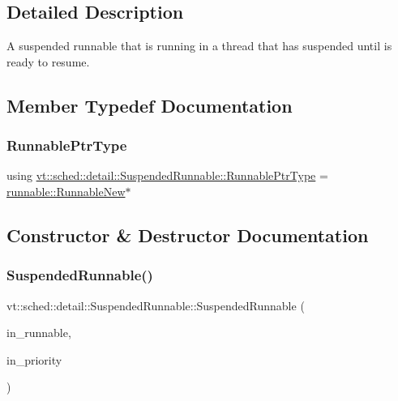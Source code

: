 \subsection{Detailed Description}
A suspended runnable that is running in a thread that has suspended until is ready to resume. 



\subsection{Member Typedef Documentation}
\mbox{\label{structvt_1_1sched_1_1detail_1_1_suspended_runnable_a537f33a52d34b0372cfa7f52ab2b6524}} 
\subsubsection{\texorpdfstring{Runnable\+Ptr\+Type}{RunnablePtrType}}
{\footnotesize\ttfamily using \hyperlink{structvt_1_1sched_1_1detail_1_1_suspended_runnable_a537f33a52d34b0372cfa7f52ab2b6524}{vt\+::sched\+::detail\+::\+Suspended\+Runnable\+::\+Runnable\+Ptr\+Type} =  \hyperlink{structvt_1_1runnable_1_1_runnable_new}{runnable\+::\+Runnable\+New}$\ast$}



\subsection{Constructor \& Destructor Documentation}
\mbox{\label{structvt_1_1sched_1_1detail_1_1_suspended_runnable_a2bc6c62d0934ab1f58f1367d62c0e4ef}} 
\subsubsection{\texorpdfstring{Suspended\+Runnable()}{SuspendedRunnable()}}
{\footnotesize\ttfamily vt\+::sched\+::detail\+::\+Suspended\+Runnable\+::\+Suspended\+Runnable (\begin{DoxyParamCaption}\item[{\hyperlink{structvt_1_1sched_1_1detail_1_1_suspended_runnable_a537f33a52d34b0372cfa7f52ab2b6524}{Runnable\+Ptr\+Type}}]{in\+\_\+runnable,  }\item[{\hyperlink{namespacevt_a86bff9f556eb761b27fc8600d006ac04}{Priority\+Type}}]{in\+\_\+priority }\end{DoxyParamCaption})\hspace{0.3cm}{\ttfamily [inline]}}



